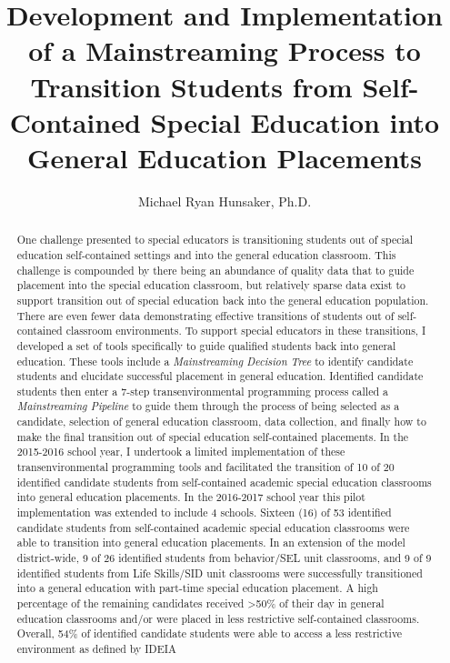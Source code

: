 \documentclass[twoside]{article}
\title{Development and Implementation of a Mainstreaming Process to Transition Students from Self-Contained Special Education into General Education Placements}
\author[1]{Michael Ryan Hunsaker, Ph.D.}
\affil[1]{University of Utah, Salt Lake City, UT, USA}
\begin{document}
%
\maketitle
%
\begin{abstract}
One challenge presented to special educators is transitioning students out of special education self-contained settings and into the general education classroom. This challenge is compounded by there being an abundance of quality data that to guide placement into the special education classroom, but relatively sparse data exist to support transition out of special education back into the general education population. There are even fewer data demonstrating effective transitions of students out of self-contained classroom environments. To support special educators in these transitions, I developed a set of tools specifically to guide qualified students back into general education. These tools include a \textit{Mainstreaming Decision Tree} to identify candidate students and elucidate successful placement in general education. Identified candidate students then enter a 7-step transenvironmental programming process called a \textit{Mainstreaming Pipeline} to guide them through the process of being selected as a candidate, selection of general education classroom, data collection, and finally how to make the final transition out of special education self-contained placements. In the 2015-2016 school year, I undertook a limited implementation of these transenvironmental programming tools and facilitated the transition of 10 of 20 identified candidate students from self-contained academic special education classrooms into general education placements. In the 2016-2017 school year this pilot implementation was extended to include 4 schools. Sixteen (16) of 53 identified candidate students from self-contained academic special education classrooms were able to transition into general education placements. In an extension of the model district-wide, 9 of 26 identified students from behavior/SEL unit classrooms, and 9 of 9 identified students from Life Skills/SID unit classrooms were successfully transitioned into a general education with part-time special education placement. A high percentage of the remaining candidates received \textgreater50\% of their day in general education classrooms and/or were placed in less restrictive self-contained classrooms. Overall, 54\% of identified candidate students were able to access a less restrictive environment as defined by IDEIA
\end{abstract}
%
\end{document}
